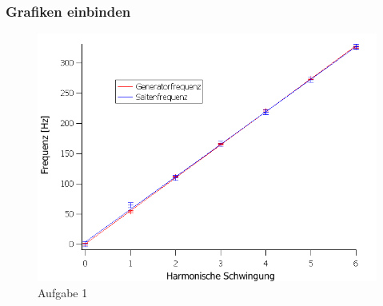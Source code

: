 \documentclass{beamer}
\begin{document}
\begin{frame}
\frametitle{Grafiken einbinden}
  \begin{figure}[htb]
    \includegraphics[height=0.7\textheight]{Aufgabe1.png}
    \caption{Aufgabe 1}
  \end{figure}
\end{frame}
%  
\end{document}
